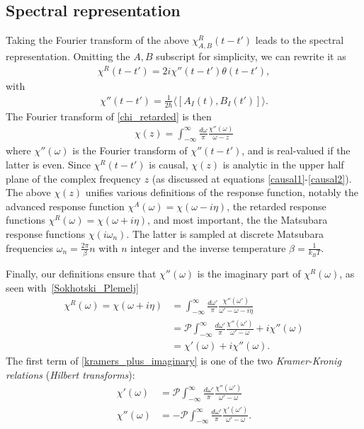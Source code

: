 \documentclass[notitlepage, 11pt, nofootinbib]{revtex4-1}
\begin{document}
\subsection{Spectral representation}
Taking the Fourier transform of the above $\chi^R_{A,B}(t-t')$ leads to the spectral representation.
Omitting the $A,B$ subscript for simplicity, we can rewrite it as
\begin{align}
\chi^{R}(t-t') = 2i\chi''(t-t')\theta(t-t'),
\label{chi_retarded}
\end{align}
with
\begin{align}
\chi''(t-t') = \frac{1}{2\hbar}\langle [A_I(t),B_I(t')]\rangle.   
\end{align}
The Fourier transform of \eqref{chi_retarded} is then
\begin{align}
\chi(z) = \int_{-\infty}^{\infty} \frac{d\omega}{\pi} \frac{\chi''(\omega)}{\omega-z}
\label{spectral_representation}
\end{align}
where $\chi''(\omega)$ is the Fourier transform of $\chi''(t-t')$, and is real-valued if the latter is even. Since $\chi^{R}(t-t')$ is causal, $\chi(z)$ is analytic in the upper half plane of the complex frequency $z$ (as discussed at equations \eqref{causal1}-\eqref{causal2}). The above $\chi(z)$ unifies various definitions of the response function, notably the advanced response function $\chi^{A}(\omega) = \chi(\omega-i\eta)$, the retarded response functions $\chi^{R}(\omega) = \chi(\omega+i\eta)$, and most important, the the Matsubara response functions $\chi(i\omega_n)$. The latter is
sampled at discrete Matsubara frequencies $\omega_{n} = \frac{2\pi}{\beta}n$ with $n$ integer and the inverse temperature $\beta=\frac{1}{k_B T}$.

Finally, our definitions ensure that $\chi''(\omega)$ is the imaginary part of $\chi^R(\omega)$, as seen with~\eqref{Sokhotski_Plemelj}
\begin{align}
\chi^R(\omega) = \chi(\omega+i\eta) 
&= 
\int_{-\infty}^{\infty} \frac{d\omega'}{\pi} \frac{\chi''(\omega')}{\omega'-\omega-i\eta}
\\
&=
\mathcal P\int_{-\infty}^{\infty} \frac{d\omega'}{\pi} \frac{\chi''(\omega')}{\omega'-\omega}
+i\chi''(\omega)
\label{kramers_plus_imaginary}
\\
&=\chi'(\omega)+i\chi''(\omega).
\end{align}
The first term of \eqref{kramers_plus_imaginary} is one of the two \emph{Kramer-Kronig relations} (\emph{Hilbert transforms}):
\begin{align}
\chi'(\omega) &= \mathcal P\int_{-\infty}^{\infty} \frac{d\omega'}{\pi} \frac{\chi''(\omega')}{\omega'-\omega}
\\
\chi''(\omega) &= -\mathcal P\int_{-\infty}^{\infty} \frac{d\omega'}{\pi} \frac{\chi'(\omega')}{\omega'-\omega}.
\end{align}
\end{document}
